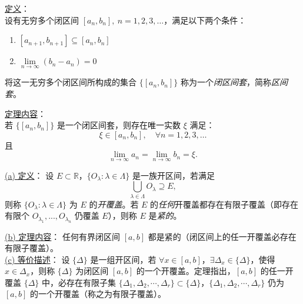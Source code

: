 \begin{theorem}[闭区间套定理]
\underline{定义}：\\
设有无穷多个闭区间 \( [a_n, b_n],\ n = 1, 2, 3, \ldots \)，满足以下两个条件：
\begin{enumerate}
    \item \( [a_{n+1}, b_{n+1}] \subseteq [a_n, b_n] \)
    \item \( \lim\limits_{n \to \infty} (b_n - a_n) = 0 \)
\end{enumerate}
将这一无穷多个闭区间所构成的集合 \(\{[a_n, b_n]\}\) 称为一个\emph{闭区间套}，简称\emph{区间套}。

\underline{定理内容}：\\
若 \(\{[a_n, b_n]\}\) 是一个闭区间套，则存在唯一实数 \(\xi\) 满足：
\[
\xi \in [a_n, b_n], \quad \forall n = 1, 2, 3, \ldots
\]
且
\[
\lim_{n \to \infty} a_n = \lim_{n \to \infty} b_n = \xi.
\]
\end{theorem}

\begin{theorem}[有限覆盖定理]
\underline{(a) 定义}：
设 \( E \subset \mathbb{R} \)，\(\{O_\lambda : \lambda \in \Lambda\}\) 是一族开区间，若满足
\[
\bigcup_{\lambda \in \Lambda} O_\lambda \supseteq E,
\]
则称 \(\{O_\lambda : \lambda \in \Lambda\}\) 为 \( E \) 的\emph{开覆盖}。若 \( E \) 的\emph{任何}开覆盖都存在有限子覆盖（即存在有限个 \(O_{\lambda_1},...,O_{\lambda_n}\) 仍覆盖 \(E\)），则称 \( E \) 是\emph{紧的}。

\underline{(b) 定理内容}：
任何有界闭区间 \([a, b]\) 都是紧的（闭区间上的任一开覆盖必存在有限子覆盖）。\\
\underline{(c) 等价描述}：
设 \(\{ \Delta \}\) 是一组开区间，若 \(\forall x \in [a,b]\)，\(\exists \Delta_x \in \{ \Delta \}\)，使得 \(x \in \Delta_x\)，则称 \(\{ \Delta \}\) 为闭区间 \([a,b]\) 的一个开覆盖。定理指出，\([a,b]\) 的任一开覆盖 \(\{ \Delta \}\) 中，必存在有限子集 \(\{\Delta_1, \Delta_2, \cdots, \Delta_r\} \subset \{ \Delta \}\)，\(\{\Delta_1, \Delta_2, \cdots, \Delta_r\}\) 仍为 \([a,b]\) 的一个开覆盖（称之为有限子覆盖）。
\end{theorem}

